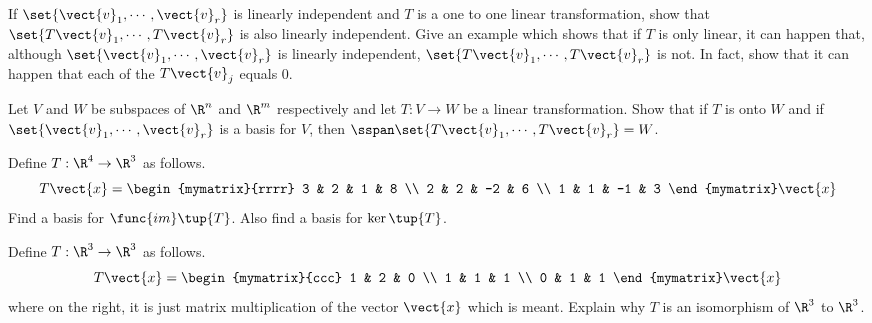 \begin{enumialphparenastyle}
\begin{ex}
\begin{sol}
\end{sol}
\end{ex}


\begin{ex} If $\set{\vect{v}_{1},\cdots ,\vect{v}_{r}} $ is linearly
independent and $T$ is a one to one linear transformation, show that $
\set{T\vect{v}_{1},\cdots ,T\vect{v}_{r}} $ is also linearly
independent. Give an example which shows that if $T$ is only linear, it can
happen that, although $\set{\vect{v}_{1},\cdots ,\vect{v}_{r}} $ is
linearly independent, $\set{T\vect{v}_{1},\cdots ,T\vect{v}_{r}} $
is not. In fact, show that it can happen that each of the $T\vect{v}_{j}$
equals 0.
\end{ex}


\begin{ex} Let $V$ and $W$ be subspaces of $\R^{n}$ and $\R^{m}$
respectively and let $T:V\rightarrow W$ be a linear transformation. Show
that if $T$ is onto $W$ and if $\set{\vect{v}_{1},\cdots ,\vect{v}
_{r}} $ is a basis for $V$, then $\sspan\set{T\vect{v}
_{1},\cdots ,T\vect{v}_{r}} =W$.
\end{ex}


\begin{ex} Define $T:\R^{4}\rightarrow \R^{3}$ as follows. 
\begin{equation*}
T\vect{x}=\begin{mymatrix}{rrrr}
3 & 2 & 1 & 8 \\ 
2 & 2 & -2 & 6 \\ 
1 & 1 & -1 & 3
\end{mymatrix} \vect{x}
\end{equation*}
Find a basis for $\func{im}\tup{T}$. Also find a basis for $\ker
\tup{T}$.
\end{ex}


\begin{ex} Define $T:\R^{3}\rightarrow \R^{3}$ as follows. 
\begin{equation*}
T\vect{x}=\begin{mymatrix}{ccc}
1 & 2 & 0 \\ 
1 & 1 & 1 \\ 
0 & 1 & 1
\end{mymatrix} \vect{x}
\end{equation*}
where on the right, it is just matrix multiplication of the vector $\vect{x}$
which is meant. Explain why $T$ is an isomorphism of $\R^{3}$ to $
\R^{3}$.
\end{ex}



\end{enumialphparenastyle}
